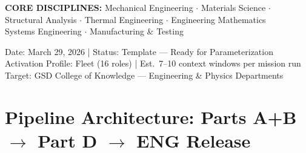 \documentclass[11pt,letterpaper]{article}
\begin{document}
\begin{center}
\vspace{1.6cm}
\begin{center}
\colorbox{lightprimary}{\parbox{12cm}{\centering\small\sffamily\textcolor{primary}{%
\textbf{CORE DISCIPLINES:} Mechanical Engineering $\cdot$ Materials Science $\cdot$\\[0.2em]
Structural Analysis $\cdot$ Thermal Engineering $\cdot$ Engineering Mathematics\\[0.2em]
Systems Engineering $\cdot$ Manufacturing \& Testing
}}}
\end{center}

\vspace{1.6cm}
{\small\sffamily\textcolor{subtlegray}{Date: March 29, 2026  |  Status: Template --- Ready for Parameterization}}\\[0.3em]
{\small\sffamily\textcolor{subtlegray}{Activation Profile: Fleet (16 roles)  |  Est.\ 7--10 context windows per mission run}}\\[0.3em]
{\small\sffamily\textcolor{subtlegray}{Target: GSD College of Knowledge --- Engineering \& Physics Departments}}
\end{center}
\newpage

\thispagestyle{fancy}
\section*{Pipeline Architecture: Parts A+B $\rightarrow$ Part D $\rightarrow$ ENG Release}
\end{document}
